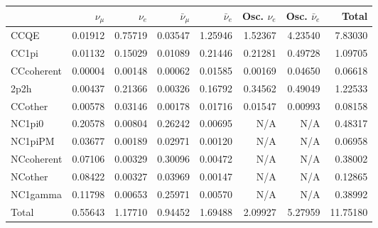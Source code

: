 \begin{tabular} { | l ||r | r | r | r | r | r | | r | }
\hline
              & $\nu_\mu$            & $\nu_e$              & $\bar{\nu}_{\mu}$    & $\bar{\nu}_{e}$      & Osc. $\nu_e$         & Osc. $\bar{\nu}_{e}$ & Total                \\ \hline\hline
 CCQE         & 0.01912              & 0.75719              & 0.03547              & 1.25946              & 1.52367              & 4.23540              & 7.83030              \\ \hline
 CC1pi        & 0.01132              & 0.15029              & 0.01089              & 0.21446              & 0.21281              & 0.49728              & 1.09705              \\ \hline
 CCcoherent   & 0.00004              & 0.00148              & 0.00062              & 0.01585              & 0.00169              & 0.04650              & 0.06618              \\ \hline
 2p2h         & 0.00437              & 0.21366              & 0.00326              & 0.16792              & 0.34562              & 0.49049              & 1.22533              \\ \hline
 CCother      & 0.00578              & 0.03146              & 0.00178              & 0.01716              & 0.01547              & 0.00993              & 0.08158              \\ \hline
 NC1pi0       & 0.20578              & 0.00804              & 0.26242              & 0.00695              & N/A                  & N/A                  & 0.48317              \\ \hline
 NC1piPM      & 0.03677              & 0.00189              & 0.02971              & 0.00120              & N/A                  & N/A                  & 0.06958              \\ \hline
 NCcoherent   & 0.07106              & 0.00329              & 0.30096              & 0.00472              & N/A                  & N/A                  & 0.38002              \\ \hline
 NCother      & 0.08422              & 0.00327              & 0.03969              & 0.00147              & N/A                  & N/A                  & 0.12865              \\ \hline
 NC1gamma     & 0.11798              & 0.00653              & 0.25971              & 0.00570              & N/A                  & N/A                  & 0.38992              \\ \hline
\hline
 Total        & 0.55643              & 1.17710              & 0.94452              & 1.69488              & 2.09927              & 5.27959              & 11.75180             \\ \hline

\end{tabular}

